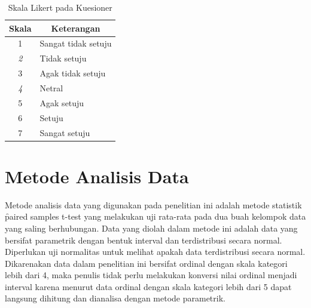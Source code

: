 \begin{enumerate}
\begin{enumerate}
		\begin{table}
			\centering
			\caption{Skala Likert pada Kuesioner}
			\label{tab:tab2}
			\begin{tabular}{|c|l|}
				\hline
				{\bf Skala} & \multicolumn{1}{c|}{{\bf Keterangan}} \\ \hline
				1           & Sangat tidak setuju                   \\ \hline
				{\it 2}     & Tidak setuju                          \\ \hline
				3           & Agak tidak setuju                     \\ \hline
				{\it 4}     & Netral                                \\ \hline
				5           & Agak setuju                           \\ \hline
				6           & Setuju                                \\ \hline
				7           & Sangat setuju                         \\ \hline                      
			\end{tabular}
		\end{table}
	\end{enumerate}
\end{enumerate}
\section{Metode Analisis Data}
Metode analisis data yang digunakan pada penelitian ini adalah metode statistik \f{paired samples t-test} yang melakukan uji rata-rata pada dua buah kelompok data yang saling berhubungan. Data yang diolah dalam metode ini adalah data yang bersifat parametrik dengan bentuk interval dan terdistribusi secara normal. Diperlukan uji normalitas untuk melihat apakah data terdistribusi secara normal. Dikarenakan data dalam penelitian ini bersifat ordinal dengan skala kategori lebih dari 4, maka penulis tidak perlu melakukan konversi nilai ordinal menjadi interval karena menurut \citet{ho.newsom} data ordinal dengan skala kategori lebih dari 5 dapat langsung dihitung dan dianalisa dengan metode parametrik.
